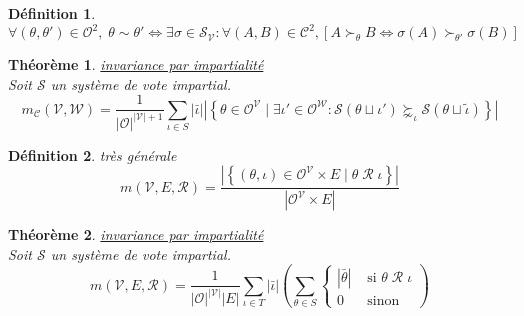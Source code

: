 \documentclass[french,11pt,a4paper]{article}
\newtheorem{definition}{Définition}
\newtheorem{theoreme}{Théorème}
\newcommand{\mc}[1]{\ensuremath{\mathcal{#1}} }  %
\begin{document}
	\begin{definition}
		\begin{equation}
			\forall (\theta, \theta') \in \mc{O}^2, \;
			\theta \sim \theta' \iff
			\exists \sigma \in \mc{S}_\mc{V} : \forall (A, B) \in \mc{C}^2,
			\left[ A \succ_\theta B \!\iff\! \sigma(A) \succ_{\theta'} \sigma(B) \right]
		\end{equation}
	\end{definition}
	
	\begin{theoreme}
		\underline{invariance par impartialité} \\
		Soit $\mathscr{S}$ un système de vote impartial.
		\begin{equation}
			m_{\mc{C}} \left( \mc{V}, \mc{W} \right) =
			\frac{1}{\left|\mc{O}\right|^{\left|\mc{V}\right|+1}}
			\sum_{\iota \in S} \left|\bar{\iota}\right|
			\left| \left\{
				\theta \in \mc{O}^\mc{V} \;|\;
				\exists \iota' \in \mc{O}^\mc{W} : \mathscr{S} (\theta \sqcup \iota') \succnsim_\iota \mathscr{S}(\theta \sqcup \tilde{\iota})
			\right\} \right|
		\end{equation}
	\end{theoreme}
	
	\begin{definition} \textit{très générale}
		\begin{equation}
			m (\mc{V}, E, \mc{R}) =
			\frac{
				\left|\left\{
					(\theta, \iota) \in \mc{O}^\mc{V} \times E \;|\;
					\theta \;\mc{R}\; \iota
				\right\}\right|
			}{
				\left| \mc{O}^\mc{V} \times E \right|
			}
		\end{equation}
	\end{definition}
	
	\begin{theoreme}
		\underline{invariance par impartialité} \\
		Soit $\mathscr{S}$ un système de vote impartial.
		\begin{equation}
			m (\mc{V}, E, \mc{R}) =
			\frac{1}{ \left|\mc{O}\right|^{\left|\mc{V}\right|} \left|E\right| }
			\sum_{\iota \in T} \left|\bar{\iota}\right|
			\left(
				\sum_{\theta \in S} 
				\left\{\begin{matrix}
					\left|\bar{\theta}\right| &\text{ si } \theta \;\mc{R}\; \iota \\
					0 &\text{ sinon}
				\end{matrix}\right.
			\right)
		\end{equation}
	\end{theoreme}
	
\end{document}

